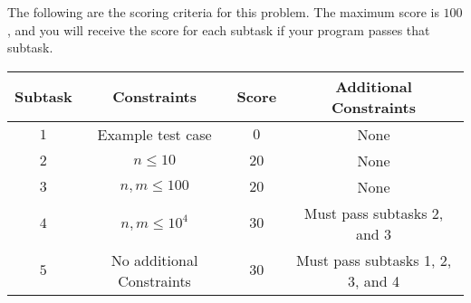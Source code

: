 The following are the scoring criteria for this problem. The maximum score is $100$, and you will receive the score for each subtask if your program passes that subtask.

\begin{center}
  \begin{tabular}{ | c | c | c | c | } \hline
    \bf{Subtask} &
    \bf{Constraints} &
    \bf{Score} &
    \bf{Additional Constraints} \\ \hline
    $1$ & Example test case & $0$ & None \\ \hline
    $2$ & $n \le 10$ & $20$ & None \\ \hline
    $3$ & $n, m \le 100$ & $20$ & None \\ \hline
    $4$ & $n, m \le 10^4$ & $30$ & Must pass subtasks 2, and 3 \\ \hline
    $5$ & No additional Constraints & $30$ & Must pass subtasks 1, 2, 3, and 4 \\ \hline
    \end{tabular}
\end{center}
